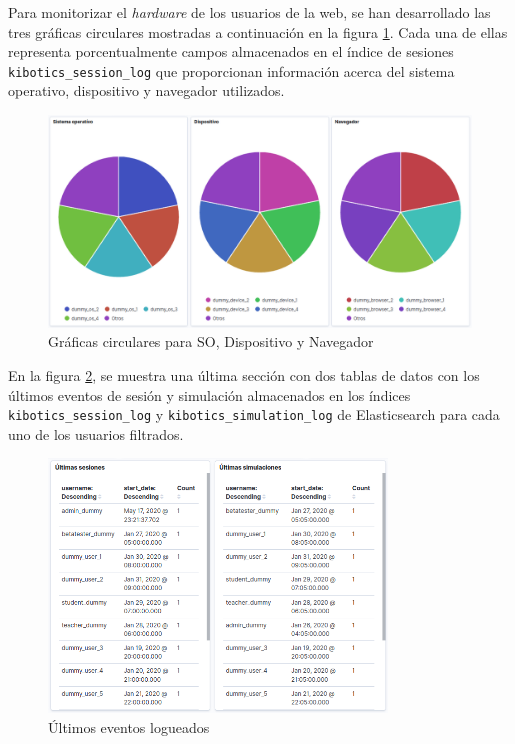 \documentclass[11pt,a4paper]{book}
\begin{document}
				Para monitorizar el \textit{hardware} de los usuarios de la web, se han desarrollado las tres gráficas circulares mostradas a continuación en la figura \ref{fig:kibana_pie}. Cada una de ellas representa porcentualmente campos almacenados en el índice de sesiones  \texttt{kibotics\_session\_log} que proporcionan información acerca del sistema operativo, dispositivo y navegador utilizados.
				\begin{figure}[H]
					\centering
					\includegraphics[width=13cm, keepaspectratio]{img/kibana_07_pie}
					\caption{Gráficas circulares para SO, Dispositivo y Navegador}
					\label{fig:kibana_pie}
				\end{figure}

				En la figura \ref{fig:kibana_latestevent}, se muestra una última sección con dos tablas de datos con los últimos eventos de sesión y simulación almacenados en los índices \texttt{kibotics\_session\_log} y \texttt{kibotics\_simulation\_log} de Elasticsearch para cada uno de los usuarios filtrados. 
				\begin{figure}[H]
					\centering
					\includegraphics[width=9cm, keepaspectratio]{img/kibana_08_latest_event}
					\caption{Últimos eventos logueados}
					\label{fig:kibana_latestevent}
				\end{figure}
\end{document}
